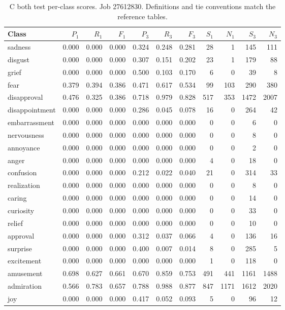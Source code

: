 \begin{table}[!htbp]
\centering
\scriptsize
\setlength{\tabcolsep}{5pt}
\begin{tabular}{lrrrrrrrrrr}
\toprule
Class & $P_1$ & $R_1$ & $F_1$ & $P_3$ & $R_3$ & $F_3$ & $S_1$ & $N_1$ & $S_3$ & $N_3$ \\
\midrule
sadness & 0.000 & 0.000 & 0.000 & 0.324 & 0.248 & 0.281 & 28 & 1 & 145 & 111 \\
disgust & 0.000 & 0.000 & 0.000 & 0.307 & 0.151 & 0.202 & 23 & 1 & 179 & 88 \\
grief & 0.000 & 0.000 & 0.000 & 0.500 & 0.103 & 0.170 & 6 & 0 & 39 & 8 \\
fear & 0.379 & 0.394 & 0.386 & 0.471 & 0.617 & 0.534 & 99 & 103 & 290 & 380 \\
disapproval & 0.476 & 0.325 & 0.386 & 0.718 & 0.979 & 0.828 & 517 & 353 & 1472 & 2007 \\
disappointment & 0.000 & 0.000 & 0.000 & 0.286 & 0.045 & 0.078 & 16 & 0 & 264 & 42 \\
embarrassment & 0.000 & 0.000 & 0.000 & 0.000 & 0.000 & 0.000 & 0 & 0 & 6 & 0 \\
nervousness & 0.000 & 0.000 & 0.000 & 0.000 & 0.000 & 0.000 & 0 & 0 & 8 & 0 \\
annoyance & 0.000 & 0.000 & 0.000 & 0.000 & 0.000 & 0.000 & 0 & 0 & 2 & 0 \\
anger & 0.000 & 0.000 & 0.000 & 0.000 & 0.000 & 0.000 & 4 & 0 & 18 & 0 \\
confusion & 0.000 & 0.000 & 0.000 & 0.212 & 0.022 & 0.040 & 21 & 0 & 314 & 33 \\
realization & 0.000 & 0.000 & 0.000 & 0.000 & 0.000 & 0.000 & 0 & 0 & 8 & 0 \\
caring & 0.000 & 0.000 & 0.000 & 0.000 & 0.000 & 0.000 & 0 & 0 & 14 & 0 \\
curiosity & 0.000 & 0.000 & 0.000 & 0.000 & 0.000 & 0.000 & 0 & 0 & 33 & 0 \\
relief & 0.000 & 0.000 & 0.000 & 0.000 & 0.000 & 0.000 & 0 & 0 & 10 & 0 \\
approval & 0.000 & 0.000 & 0.000 & 0.312 & 0.037 & 0.066 & 4 & 0 & 136 & 16 \\
surprise & 0.000 & 0.000 & 0.000 & 0.400 & 0.007 & 0.014 & 8 & 0 & 285 & 5 \\
excitement & 0.000 & 0.000 & 0.000 & 0.000 & 0.000 & 0.000 & 1 & 0 & 118 & 0 \\
amusement & 0.698 & 0.627 & 0.661 & 0.670 & 0.859 & 0.753 & 491 & 441 & 1161 & 1488 \\
admiration & 0.566 & 0.783 & 0.657 & 0.788 & 0.988 & 0.877 & 847 & 1171 & 1612 & 2020 \\
joy & 0.000 & 0.000 & 0.000 & 0.417 & 0.052 & 0.093 & 5 & 0 & 96 & 12 \\
\bottomrule
\end{tabular}
\caption{C both test per-class scores. Job 27612830. Definitions and tie conventions match the reference tables.}
\label{tab:classes-c_emotion_both}
\end{table}
